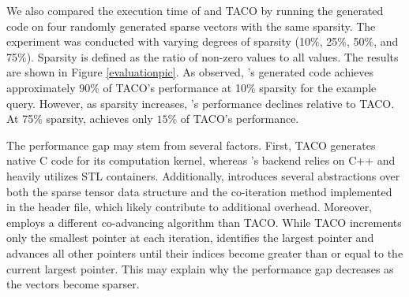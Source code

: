\documentclass[acmsmall,nonacm]{acmart}\settopmatter{printfolios=true,printccs=false,printacmref=false}
\newcommand{\rhyme}{\text{Rhyme}\xspace}
\begin{document}

We also compared the execution time of \rhyme and TACO by running the generated code on four randomly generated sparse vectors with the same sparsity. The experiment was conducted with varying degrees of sparsity (10$\%$, 25$\%$, 50$\%$, and 75$\%$). Sparsity is defined as the ratio of non-zero values to all values. The results are shown in Figure \ref{evaluationpic}. As observed, \rhyme's generated code achieves approximately $90\%$ of TACO's performance at 10$\%$ sparsity for the example query. However, as sparsity increases, \rhyme's performance declines relative to TACO. At 75$\%$ sparsity, \rhyme achieves only $15\%$ of TACO's performance.\par
The performance gap may stem from several factors. First, TACO generates native C code for its computation kernel, whereas \rhyme's backend relies on C++ and heavily utilizes STL containers. Additionally, \rhyme introduces several abstractions over both the sparse tensor data structure and the co-iteration method implemented in the header file, which likely contribute to additional overhead. Moreover, \rhyme employs a different co-advancing algorithm than TACO. While TACO increments only the smallest pointer at each iteration, \rhyme identifies the largest pointer and advances all other pointers until their indices become greater than or equal to the current largest pointer. This may explain why the performance gap decreases as the vectors become sparser.\par
\end{document}
